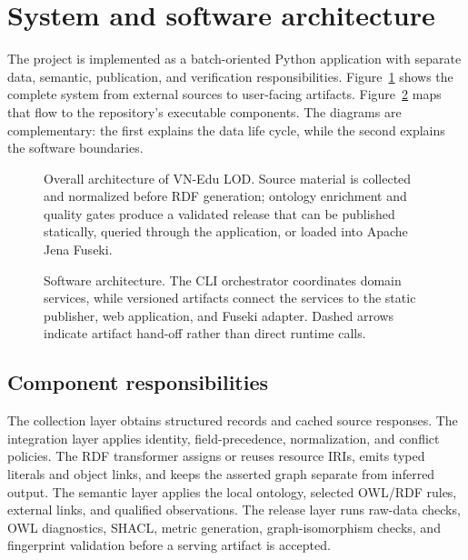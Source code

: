 \section{System and software architecture}
\label{sec:software-architecture}
The project is implemented as a batch-oriented Python application with separate data,
semantic, publication, and verification responsibilities. Figure~\ref{fig:system-architecture}
shows the complete system from external sources to user-facing artifacts. Figure~\ref{fig:software-architecture}
maps that flow to the repository's executable components. The diagrams are complementary:
the first explains the data life cycle, while the second explains the software boundaries.

\begin{figure}[htbp]\centering
\resizebox{\textwidth}{!}{}
\caption[Overall VN-Edu LOD architecture]{Overall architecture of VN-Edu LOD. Source material is
collected and normalized before RDF generation; ontology enrichment and quality gates produce a
validated release that can be published statically, queried through the application, or loaded
into Apache Jena Fuseki.}
\label{fig:system-architecture}
\end{figure}

\begin{figure}[htbp]\centering
\resizebox{\textwidth}{!}{}
\caption[Software architecture and repository components]{Software architecture. The CLI orchestrator
coordinates domain services, while versioned artifacts connect the services to the static publisher,
web application, and Fuseki adapter. Dashed arrows indicate artifact hand-off rather than direct
runtime calls.}
\label{fig:software-architecture}
\end{figure}

\subsection{Component responsibilities}
The collection layer obtains structured records and cached source responses. The integration
layer applies identity, field-precedence, normalization, and conflict policies. The RDF
transformer assigns or reuses resource IRIs, emits typed literals and object links, and keeps
the asserted graph separate from inferred output. The semantic layer applies the local ontology,
selected OWL/RDF rules, external links, and qualified observations. The release layer runs
raw-data checks, OWL diagnostics, SHACL, metric generation, graph-isomorphism checks, and
fingerprint validation before a serving artifact is accepted.

